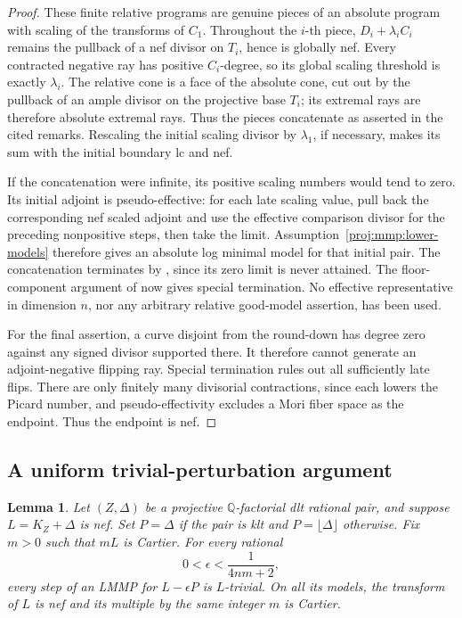 \documentclass[11pt,letterpaper]{article}
\newtheorem{lemma}[theorem]{Lemma}
\theoremstyle{definition}
\theoremstyle{remark}
\begin{document}
\begin{proof}
These finite relative programs are genuine pieces of an absolute
program with scaling of the transforms of \(C_1\).
Throughout the \(i\)-th piece, \(D_i+\lambda_i C_i\) remains
the pullback of a nef divisor on \(T_i\), hence is globally nef.
Every contracted negative ray has positive \(C_i\)-degree,
so its global scaling threshold is exactly \(\lambda_i\).
The relative cone is a face of the absolute cone, cut out by
the pullback of an ample divisor on the projective base \(T_i\);
its extremal rays are therefore absolute extremal rays.
Thus the pieces concatenate as asserted in the cited remarks.
Rescaling the initial scaling divisor by \(\lambda_1\), if
necessary, makes its sum with the initial boundary lc and nef.

If the concatenation were infinite, its positive scaling numbers
would tend to zero. Its initial adjoint is pseudo-effective:
for each late scaling value, pull back the corresponding nef
scaled adjoint and use the effective comparison divisor for
the preceding nonpositive steps, then take the limit.
Assumption~\ref{proj:mmp:lower-models} therefore gives an absolute
log minimal model for that initial pair. The concatenation
terminates by \cite[Theorem~1.9(iii)]{Proj-Birkar2012Special}, since
its zero limit is never attained. The floor-component argument
of \cite[Lemma~3.6]{Proj-Birkar2010} now gives special termination.
No effective representative in dimension \(n\), nor any
arbitrary relative good-model assertion, has been used.

For the final assertion, a curve disjoint from the round-down
has degree zero against any signed divisor supported there.
It therefore cannot generate an adjoint-negative flipping ray.
Special termination rules out all sufficiently late flips.
There are only finitely many divisorial contractions, since
each lowers the Picard number, and pseudo-effectivity excludes
a Mori fiber space as the endpoint. Thus the endpoint is nef.
\end{proof}

\subsection{A uniform trivial-perturbation argument}

\begin{lemma}\label{proj:mmp:trivial-perturbation}
Let \((Z,\Delta)\) be a projective \(\mathbb{Q}\)-factorial dlt rational
pair, and suppose \(L=K_Z+\Delta\) is nef.
Set \(P=\Delta\) if the pair is klt and
\(P=\lfloor\Delta\rfloor\) otherwise.
Fix \(m>0\) such that \(mL\) is Cartier.
For every rational
\[
 0<\epsilon<\frac{1}{4nm+2},
\]
every step of an LMMP for \(L-\epsilon P\) is \(L\)-trivial.
On all its models, the transform of \(L\) is nef and its
multiple by the same integer \(m\) is Cartier.
\end{lemma}
\end{document}
